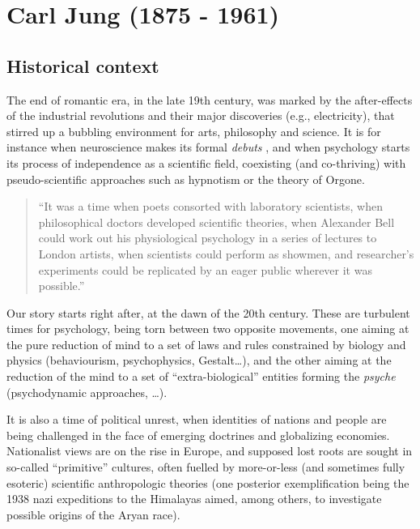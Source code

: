 \documentclass[
]{book}
\begin{document}
\hypertarget{carl-jung-1875---1961}{%
\section{Carl Jung (1875 - 1961)}\label{carl-jung-1875---1961}}

\hypertarget{historical-context}{%
\subsection{Historical context}\label{historical-context}}

The end of romantic era, in the late 19th century, was marked by the after-effects of the industrial revolutions and their major discoveries (e.g., electricity), that stirred up a bubbling environment for arts, philosophy and science. It is for instance when neuroscience makes its formal \emph{debuts} \citep[even though the term ``neuroscience'' would appear only a century later, in the 1960s;][]{rose20155o}, and when psychology starts its process of independence as a scientific field, coexisting (and co-thriving) with pseudo-scientific approaches such as hypnotism or the theory of Orgone.

\begin{quote}
``It was a time when poets consorted with laboratory scientists,
when philosophical doctors developed scientific theories,
when Alexander Bell could work out his physiological psychology in a series of lectures to London artists,
when scientists could perform as showmen,
and researcher's experiments could be replicated by an eager public wherever it was possible.'' \citep{richardson2001british}
\end{quote}

Our story starts right after, at the dawn of the 20th century. These are turbulent times for psychology, being torn between two opposite movements, one aiming at the pure reduction of mind to a set of laws and rules constrained by biology and physics (behaviourism, psychophysics, Gestalt\ldots), and the other aiming at the reduction of the mind to a set of ``extra-biological'' entities forming the \emph{psyche} (psychodynamic approaches, \ldots).

It is also a time of political unrest, when identities of nations and people are being challenged in the face of emerging doctrines and globalizing economies. Nationalist views are on the rise in Europe, and supposed lost roots are sought in so-called ``primitive'' cultures, often fuelled by more-or-less (and sometimes fully esoteric) scientific anthropologic theories (one posterior exemplification being the 1938 nazi expeditions to the Himalayas aimed, among others, to investigate possible origins of the Aryan race).
\end{document}
